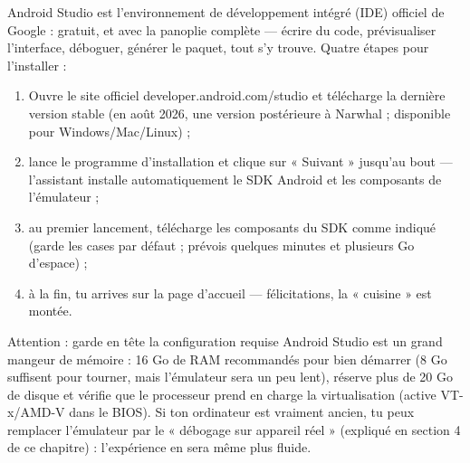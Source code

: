


Android Studio est l'environnement de développement intégré (IDE) officiel de Google : gratuit, et avec la panoplie complète — écrire du code, prévisualiser l'interface, déboguer, générer le paquet, tout s'y trouve. Quatre étapes pour l'installer :

\begin{enumerate}
  \item Ouvre le site officiel developer.android.com/studio et télécharge la dernière version stable (en août 2026, une version postérieure à Narwhal ; disponible pour Windows/Mac/Linux) ;
  \item lance le programme d'installation et clique sur « Suivant » jusqu'au bout — l'assistant installe automatiquement le SDK Android et les composants de l'émulateur ;
  \item au premier lancement, télécharge les composants du SDK comme indiqué (garde les cases par défaut ; prévois quelques minutes et plusieurs Go d'espace) ;
  \item à la fin, tu arrives sur la page d'accueil — félicitations, la « cuisine » est montée.
\end{enumerate}

\begin{tcbwarn}{Attention : garde en tête la configuration requise}
Android Studio est un grand mangeur de mémoire : 16 Go de RAM recommandés pour bien démarrer (8 Go suffisent pour tourner, mais l'émulateur sera un peu lent), réserve plus de 20 Go de disque et vérifie que le processeur prend en charge la virtualisation (active VT-x/AMD-V dans le BIOS). Si ton ordinateur est vraiment ancien, tu peux remplacer l'émulateur par le « débogage sur appareil réel » (expliqué en section 4 de ce chapitre) : l'expérience en sera même plus fluide.

\end{tcbwarn}

